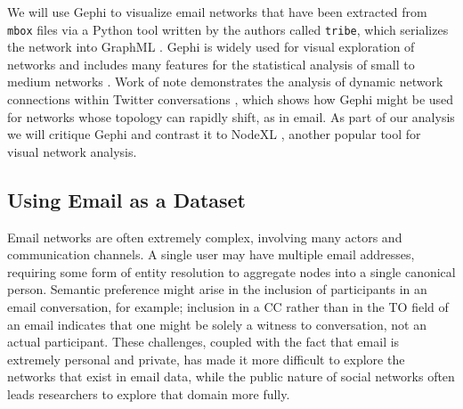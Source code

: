 \documentclass[11pt,letterpaper]{article}
\begin{document}
We will use Gephi \cite{gephi_gephi-open_2010} to visualize email networks that have been extracted from \texttt{mbox} files via a Python tool written by the authors called \texttt{tribe}, which serializes the network into GraphML \cite{brandes_graph_2010}. Gephi is widely used for visual exploration of networks \cite{bastian_gephi:_2009} and includes many features for the statistical analysis of small to medium networks \cite{mcsweeney_gephi_2009}. Work of note demonstrates the analysis of dynamic network connections within Twitter conversations \cite{bruns_how_2012}, which shows how Gephi might be used for networks whose topology can rapidly shift, as in email. As part of our analysis we will critique Gephi and contrast it to NodeXL \cite{smith_nodexl:_2010}, another popular tool for visual network analysis.

\subsection*{Using Email as a Dataset}

Email networks are often extremely complex, involving many actors and communication channels. A single user may have multiple email addresses, requiring some form of entity resolution to aggregate nodes into a single canonical person. Semantic preference might arise in the inclusion of participants in an email conversation, for example; inclusion in a CC rather than in the TO field of an email indicates that one might be solely a witness to conversation, not an actual participant. These challenges, coupled with the fact that email is extremely personal and private, has made it more difficult to explore the networks that exist in email data, while the public nature of social networks often leads researchers to explore that domain more fully.
\end{document}
